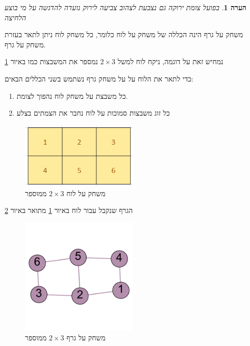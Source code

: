\documentclass[12pt,leqno]{article}
\newtheorem{comm}{הערה}[section]
\begin{document}
\begin{comm}
    בפועל צומת ירוקה גם נצבעת לצהוב צביעה לירוק נועדה להדגשה על מי בוצע הלחיצה
\end{comm}

משחק על גרף הינה הכללה  של משחק על לוח כלומר, כל משחק 
לוח ניתן לתאר בעזרת משחק על גרף.

נמחיש זאת על דוגמה, ניקח לוח למשל
$2 \times 3$
נמספר את המשבצות כמו באיור
\ref{2x3_board}

כדי לתאר את הלוח על על משחק גרף נשתמש בשני הכללים הבאים:
\begin{enumerate}
    \item 
    כל משבצת על משחק לוח נהפוך לצומת.
    \item 
    כל זוג משבצות סמוכות על לוח נחבר את הצמתים בצלע
\end{enumerate}

\begin{figure}[ht]
    \caption{
        משחק על לוח
        $2 \times 3$
        ממוספר
    }
    \label{2x3_board}
    \centering
    \includegraphics[width=0.5\textwidth,height=0.5\textheight,keepaspectratio]{images/2x3_board.PNG}
\end{figure}

הגרף שנקבל עבור לוח באיור
\ref{2x3_board}
מתואר באיור
\ref{2x3_graph}

\begin{figure}[ht]
    \caption{
        משחק על גרף
        $2 \times 3$
        ממוספר
    }
    \centering
    \label{2x3_graph}
    \includegraphics[width=0.5\textwidth,height=0.5\textheight,keepaspectratio]{images/2x3_graph.png}
\end{figure}
\end{document}
